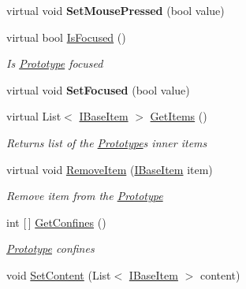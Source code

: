 \begin{DoxyCompactItemize}
\mbox{\label{class_space_v_i_l_1_1_prototype_acef7830db4bf07583eea2f6057258d6d}} 
virtual void {\bfseries Set\+Mouse\+Pressed} (bool value)
\item 
virtual bool \mbox{\hyperlink{class_space_v_i_l_1_1_prototype_aa89bae9f05c9cfce9c1dda5231b3b321}{Is\+Focused}} ()
\begin{DoxyCompactList}\small\item\em Is \mbox{\hyperlink{class_space_v_i_l_1_1_prototype}{Prototype}} focused \end{DoxyCompactList}\item 
\mbox{\label{class_space_v_i_l_1_1_prototype_a26f69bbb1e267956b567aaf6181dc345}} 
virtual void {\bfseries Set\+Focused} (bool value)
\item 
virtual List$<$ \mbox{\hyperlink{interface_space_v_i_l_1_1_core_1_1_i_base_item}{I\+Base\+Item}} $>$ \mbox{\hyperlink{class_space_v_i_l_1_1_prototype_a6d5e123222980d052f762368a17b6826}{Get\+Items}} ()
\begin{DoxyCompactList}\small\item\em Returns list of the \mbox{\hyperlink{class_space_v_i_l_1_1_prototype}{Prototype}}\textquotesingle{}s inner items \end{DoxyCompactList}\item 
virtual void \mbox{\hyperlink{class_space_v_i_l_1_1_prototype_a7a2aabccfe6389f71d0265fa73f0ae87}{Remove\+Item}} (\mbox{\hyperlink{interface_space_v_i_l_1_1_core_1_1_i_base_item}{I\+Base\+Item}} item)
\begin{DoxyCompactList}\small\item\em Remove item from the \mbox{\hyperlink{class_space_v_i_l_1_1_prototype}{Prototype}} \end{DoxyCompactList}\item 
int \mbox{[}$\,$\mbox{]} \mbox{\hyperlink{class_space_v_i_l_1_1_prototype_a5d6fa221e52785b78d1e3cd706a38abb}{Get\+Confines}} ()
\begin{DoxyCompactList}\small\item\em \mbox{\hyperlink{class_space_v_i_l_1_1_prototype}{Prototype}} confines \end{DoxyCompactList}\item 
void \mbox{\hyperlink{class_space_v_i_l_1_1_prototype_aae3089e9f3585ccbf1b5a935cf0c0b27}{Set\+Content}} (List$<$ \mbox{\hyperlink{interface_space_v_i_l_1_1_core_1_1_i_base_item}{I\+Base\+Item}} $>$ content)

\end{DoxyCompactItemize}
